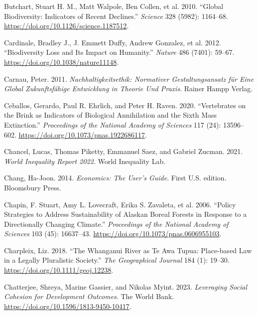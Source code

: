 \documentclass[
  a4paper,
  DIV=11,
  numbers=noendperiod,
  oneside,
  openany]{scrreprt}
\newlength{\cslhangindent}
\newenvironment{CSLReferences}[2] %
 {\begin{list}{}{%
  \setlength{\itemindent}{0pt}
  \setlength{\leftmargin}{0pt}
  \setlength{\parsep}{0pt}
  \ifodd #1
   \setlength{\leftmargin}{\cslhangindent}
   \setlength{\itemindent}{-1\cslhangindent}
  \fi
  \setlength{\itemsep}{#2\baselineskip}}}
 {\end{list}}
\begin{document}
\begin{CSLReferences}{1}{1}
{Butchart, Stuart H. M., Matt Walpole, Ben Collen, et al.} 2010.
{``Global {Biodiversity}: {Indicators} of {Recent Declines}.''}
\emph{Science} 328 (5982): 1164--68.
\url{https://doi.org/10.1126/science.1187512}.

Cardinale, Bradley J., J. Emmett Duffy, Andrew Gonzalez, et al. 2012.
{``Biodiversity Loss and Its Impact on Humanity.''} \emph{Nature} 486
(7401): 59--67. \url{https://doi.org/10.1038/nature11148}.

Carnau, Peter. 2011. \emph{Nachhaltigkeitsethik: {Normativer
Gestaltungsansatz} f{ü}r Eine Global Zukunftsf{ä}hige {Entwicklung} in
{Theorie} Und {Praxis}}. Rainer Hampp Verlag.

Ceballos, Gerardo, Paul R. Ehrlich, and Peter H. Raven. 2020.
{``Vertebrates on the Brink as Indicators of Biological Annihilation and
the Sixth Mass Extinction.''} \emph{Proceedings of the National Academy
of Sciences} 117 (24): 13596--602.
\url{https://doi.org/10.1073/pnas.1922686117}.

Chancel, Lucas, Thomas Piketty, Emmanuel Saez, and Gabriel Zucman. 2021.
\emph{World {Inequality Report} 2022}. World Inequality Lab.

Chang, Ha-Joon. 2014. \emph{Economics: {The User}'s {Guide}}. First U.S.
edition. Bloomsbury Press.

Chapin, F. Stuart, Amy L. Lovecraft, Erika S. Zavaleta, et al. 2006.
{``Policy Strategies to Address Sustainability of {Alaskan} Boreal
Forests in Response to a Directionally Changing Climate.''}
\emph{Proceedings of the National Academy of Sciences} 103 (45):
16637--43. \url{https://doi.org/10.1073/pnas.0606955103}.

Charpleix, Liz. 2018. {``The {Whanganui River} as {Te Awa Tupua}:
{Place-based} Law in a Legally Pluralistic Society.''} \emph{The
Geographical Journal} 184 (1): 19--30.
\url{https://doi.org/10.1111/geoj.12238}.

Chatterjee, Shreya, Marine Gassier, and Nikolas Myint. 2023.
\emph{Leveraging {Social Cohesion} for {Development Outcomes}}. The
World Bank. \url{https://doi.org/10.1596/1813-9450-10417}.


\end{CSLReferences}
\end{document}
